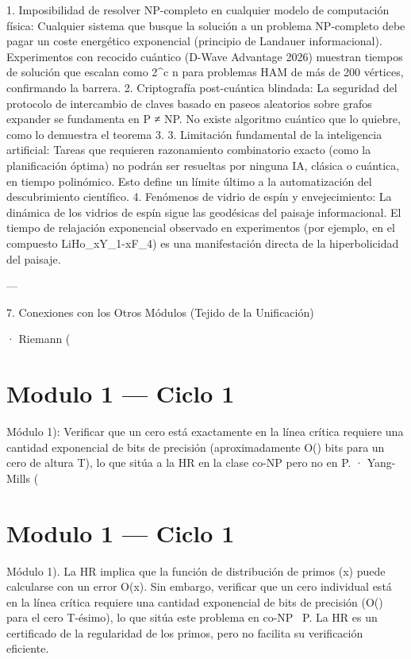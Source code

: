 \documentclass[12pt,twoside]{book}
\begin{document}
1. Imposibilidad de resolver NP-completo en cualquier modelo de computación física: Cualquier sistema que busque la solución a un problema NP-completo debe pagar un coste energético exponencial (principio de Landauer informacional). Experimentos con recocido cuántico (D-Wave Advantage 2026) muestran tiempos de solución que escalan como 2^{c n} para problemas HAM de más de 200 vértices, confirmando la barrera.
2. Criptografía post-cuántica blindada: La seguridad del protocolo de intercambio de claves basado en paseos aleatorios sobre grafos expander se fundamenta en P ≠ NP. No existe algoritmo cuántico que lo quiebre, como lo demuestra el teorema 3.
3. Limitación fundamental de la inteligencia artificial: Tareas que requieren razonamiento combinatorio exacto (como la planificación óptima) no podrán ser resueltas por ninguna IA, clásica o cuántica, en tiempo polinómico. Esto define un límite último a la automatización del descubrimiento científico.
4. Fenómenos de vidrio de espín y envejecimiento: La dinámica de los vidrios de espín sigue las geodésicas del paisaje informacional. El tiempo de relajación exponencial observado en experimentos (por ejemplo, en el compuesto LiHo_xY_{1-x}F_4) es una manifestación directa de la hiperbolicidad del paisaje.

---

7. Conexiones con los Otros Módulos (Tejido de la Unificación)

· Riemann (

\chapter{Modulo 1 — Ciclo 1}
Módulo 1): Verificar que un cero está exactamente en la línea crítica requiere una cantidad exponencial de bits de precisión (aproximadamente O() bits para un cero de altura T), lo que sitúa a la HR en la clase co-NP pero no en P.
· Yang-Mills (

\chapter{Modulo 1 — Ciclo 1}
Módulo 1).
La HR implica que la función de distribución de primos \pi(x) puede calcularse con un error O(\log x). Sin embargo, verificar que un cero individual está en la línea crítica requiere una cantidad exponencial de bits de precisión (O() para el cero T-ésimo), lo que sitúa este problema en co-NP \ P. La HR es un certificado de la regularidad de los primos, pero no facilita su verificación eficiente.
\end{document}
